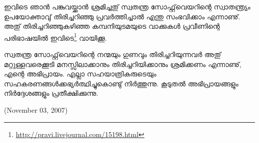 ഇവിടെ ഞാന്‍ പങ്കുവയ്ക്കാന്‍ ശ്രമിച്ചതു് സ്വതന്ത്ര സോഫ്റ്റ്‌വെയറിന്റെ സ്വാതന്ത്ര്യം ഉപയോക്താവു് തിരിച്ചറിഞ്ഞു പ്രവര്‍ത്തിച്ചാല്‍ എന്തു സംഭവിക്കാം എന്നാണു്. അതു് തിരിച്ചറിഞ്ഞുകഴിഞ്ഞ കമ്പനിയുടമയുടെ വാക്കുകള്‍ പ്രവീണിന്റെ പരിഭാഷയില്‍ ഇവിടെ\footnote{\url{http://pravi.livejournal.com/15198.html}} വായിക്കൂ.

സ്വതന്ത്ര സോഫ്റ്റ്‌വെയറിന്റെ നന്മയും ഗുണവും തിരിച്ചറിയുന്നവര്‍ അതു് മറ്റുള്ളവരെക്കൂടി മനസ്സിലാക്കാനും തിരിച്ചറിയിക്കാനും ശ്രമിക്കണം എന്നാണു്, എന്റെ അഭിപ്രായം. 
എല്ലാ സഹയാത്രികരുടെയും സഹകരണങ്ങള്‍ക്കഭ്യര്‍ത്ഥിച്ചുകൊണ്ടു് നിര്‍ത്തുന്നു. കൂടുതല്‍ അഭിപ്രായങ്ങളും നിര്‍ദ്ദേശങ്ങളും പ്രതീക്ഷിക്കുന്നു.

\begin{flushright}(November 03, 2007)\end{flushright}
\newpage
